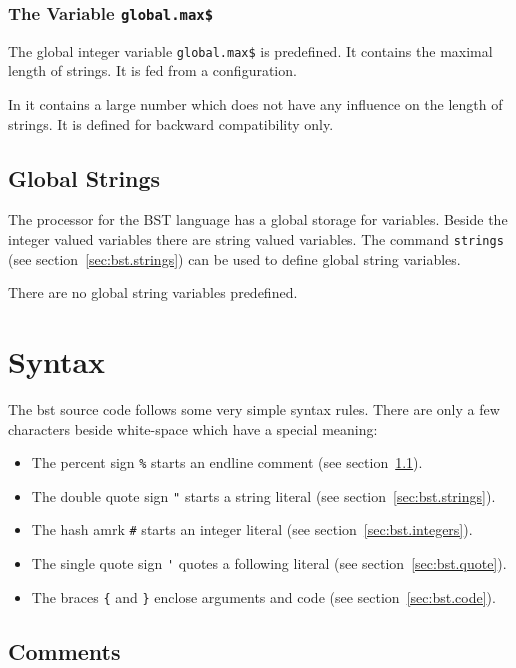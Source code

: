 \subsubsection{The Variable \texttt{global.max\$}}%

The global integer variable \texttt{global.max\$} is predefined. It
contains the maximal length of strings. It is fed from a
configuration.

In \ExBib{} it contains a large number which does
not have any influence on the length of strings. It is defined for
backward compatibility only.


\subsection{Global Strings}

The processor for the BST language has a global storage for variables.
Beside the integer valued variables there are string valued variables.
The command \texttt{strings} (see section~\ref{sec:bst.strings}) can be
used to define global string variables.

There are no global string variables predefined.


\section{Syntax}

The bst source code follows some very simple syntax rules. There are
only a few characters beside white-space which have a special meaning:

\begin{itemize}
\item The percent sign \verb|%| starts an endline comment (see
  section~\ref{sec:bst.comments}).
\item The double quote sign \verb|"| starts a string literal (see
  section~\ref{sec:bst.strings}).
\item The hash amrk \verb|#| starts an integer literal (see
  section~\ref{sec:bst.integers}).
\item The single quote sign \verb|'| quotes a following literal (see
  section~\ref{sec:bst.quote}).
\item The braces \verb|{| and \verb|}| enclose arguments and code (see
  section~\ref{sec:bst.code}).
\end{itemize}


\subsection{Comments}\label{sec:bst.comments}


